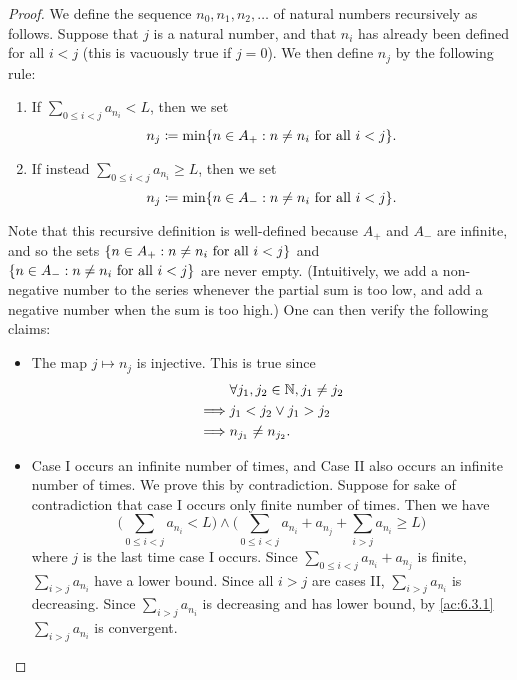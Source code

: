 \begin{proof}
  We define the sequence \(n_0, n_1, n_2, \dots\) of natural numbers recursively as follows.
  Suppose that \(j\) is a natural number, and that \(n_i\) has already been defined for all \(i < j\) (this is vacuously true if \(j = 0\)).
  We then define \(n_j\) by the following rule:
  \begin{enumerate}[label=(\Roman*)]
    \item If \(\sum_{0 \leq i < j} a_{n_i} < L\), then we set
          \[
            n_j \coloneqq \min\set{n \in A_+ : n \neq n_i \text{ for all } i < j}.
          \]
    \item If instead \(\sum_{0 \leq i < j} a_{n_i} \geq L\), then we set
          \[
            n_j \coloneqq \min\set{n \in A_- : n \neq n_i \text{ for all } i < j}.
          \]
  \end{enumerate}
  Note that this recursive definition is well-defined because \(A_+\) and \(A_-\) are infinite, and so the sets \(\left\lbrace n \in A_+ : n \neq n_i \text{ for all } i < j\right\rbrace\) and \(\left\lbrace n \in A_- : n \neq n_i \text{ for all } i < j\right\rbrace\) are never empty.
  (Intuitively, we add a non-negative number to the series whenever the partial sum is too low, and add a negative number when the sum is too high.)
  One can then verify the following claims:
  \begin{itemize}
    \item The map \(j \mapsto n_j\) is injective.
          This is true since
          \begin{align*}
                     & \forall j_1, j_2 \in \mathbb{N}, j_1 \neq j_2 \\
            \implies & j_1 < j_2 \lor j_1 > j_2              \\
            \implies & n_{j_1} \neq n_{j_2}.
          \end{align*}
    \item Case I occurs an infinite number of times, and Case II also occurs an infinite number of times.
          We prove this by contradiction.
          Suppose for sake of contradiction that case I occurs only finite number of times.
          Then we have
          \[
            \Bigg(\sum_{0 \leq i < j} a_{n_i} < L\Bigg) \land \Bigg(\sum_{0 \leq i < j} a_{n_i} + a_{n_j} + \sum_{i > j} a_{n_i} \geq L\Bigg)
          \]
          where \(j\) is the last time case I occurs.
          Since \(\sum_{0 \leq i < j} a_{n_i} + a_{n_j}\) is finite, \(\sum_{i > j} a_{n_i}\) have a lower bound.
          Since all \(i > j\) are cases II, \(\sum_{i > j} a_{n_i}\) is decreasing.
          Since \(\sum_{i > j} a_{n_i}\) is decreasing and has lower bound, by \cref{ac:6.3.1} \(\sum_{i > j} a_{n_i}\) is convergent.

\end{itemize}
\end{proof}
